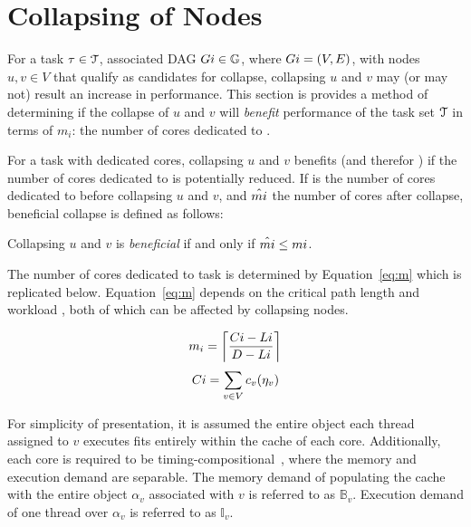 \section{Collapsing of Nodes}
\label{sec:collapse-bound}

For a task ${\task{i} \in \tasks{}}$, associated DAG
${\Dag{i} \in \dagset{}}$, where ${\Dag{i} = (V, E)}$, with nodes
${u,v \in V}$ that qualify as candidates for collapse, collapsing
${u}$ and ${v}$ may (or may not) result an increase in
performance. This section is provides a method of determining if the
collapse of ${u}$ and ${v}$ will \emph{benefit} performance of the
task set ${\tasks{}}$ in terms of ${m_i}$: the number of cores
dedicated to .

For a task  with  dedicated cores, collapsing
${u}$ and ${v}$ benefits  (and therefor \tasks{}) if the
number of cores dedicated to  is potentially reduced. If
 is the number of cores dedicated to  before
collapsing ${u}$ and ${v}$, and ${\hat{\noofcores{i}}}$ the number of
cores after collapse, beneficial collapse is defined as follows: 

\begin{definition}
  Collapsing ${u}$ and ${v}$ is \emph{beneficial} if and only if
  ${\hat{\noofcores{i}} \le \noofcores{i}}$.
\end{definition}

The number of cores dedicated to task  is determined by
Equation~\ref{eq:m} which is replicated below. Equation~\ref{eq:m}
depends on the critical path length  and workload
, both of which can be affected by collapsing nodes.

\begin{multicols}{2}
  \begin{equation*}
    m_i = \left\lceil
      \frac{\workload{i} - \criticalpathlen{i}}
           {\Deadline{i} - \criticalpathlen{i}}
    \right\rceil
  \end{equation*}
  \begin{equation*}
    \workload{i} = \sum_{v \in V} c_v(\eta_v)
  \end{equation*}
\end{multicols}

For simplicity of presentation, it is assumed the entire object each
thread assigned to ${v}$ executes fits entirely within the
cache of each core. Additionally, each core is required to be
timing-compositional~\addcite{}, where the memory and execution demand
are separable. The memory demand of populating the cache with the
entire object ${\alpha_v}$ associated with ${v}$ is referred to as
${\mathbb{B}_v}$. Execution demand of one thread over ${\alpha_v}$ is
referred to as ${\mathbb{I}_v}$. 

